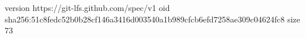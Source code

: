 version https://git-lfs.github.com/spec/v1
oid sha256:51c8fedc52b0b28cf146a3416d003540a1b989cfcb6efd7258ae309c04624fc8
size 73
